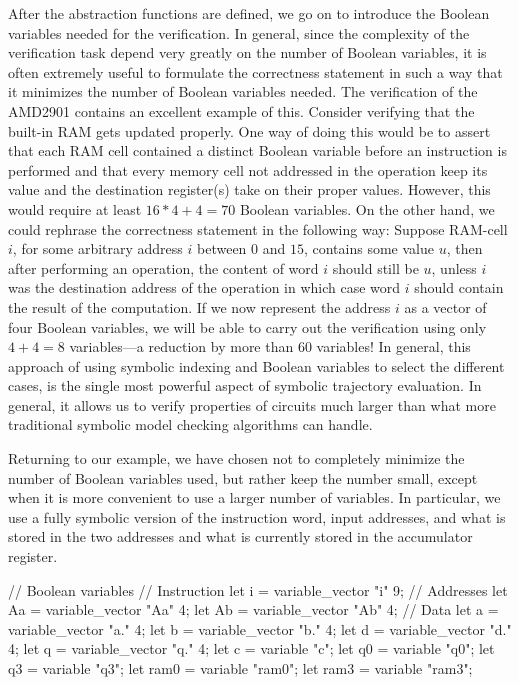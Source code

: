 After the abstraction functions are defined, we go on to introduce the
Boolean variables%
%
{} needed for the verification.
In general, since the complexity of the verification%
%
{} task
depend very greatly on the number of Boolean variables, it is
often extremely useful to formulate the correctness statement in such
a way that it minimizes the number of Boolean variables needed.
The verification of the AMD2901 contains an excellent example
of this.
Consider verifying that the built-in RAM gets updated properly.
One way of doing this would be to assert that each RAM cell contained a
distinct Boolean variable before an instruction is performed and that
every memory cell not addressed in the operation keep its value and the
destination register(s) take on their proper values.
However, this would require at least $16*4+4=70$ Boolean variables.
On the other hand, we could rephrase the correctness statement in the
following way:
Suppose RAM-cell $i$, for some arbitrary address $i$ between $0$ and $15$,
contains some value $u$, then after performing an operation, the content
of word $i$ should still be $u$, unless $i$ was the destination address of the
operation in which case word $i$ should contain the result of the computation.
If we now represent the address $i$ as a vector of four Boolean variables,
we will be able to carry out the verification using only $4+4=8$ variables---a
reduction by more than 60 variables!
In general, this approach of using symbolic indexing and Boolean variables
to select the different cases, is the single most powerful aspect of symbolic
trajectory evaluation.
In general, it allows us to verify properties of circuits much larger
than what more traditional symbolic model checking algorithms can handle.

Returning to our example, we have chosen not to completely minimize
the number of Boolean variables used, but rather keep the number small,
except when it is more convenient to use a larger number of variables.
In particular, we use a fully symbolic version of the instruction word, 
input addresses, and what is stored in the two addresses and what is
currently stored in the accumulator register.
\begin{hol}
// Boolean variables
// Instruction
let i = variable\_vector "i" 9;
// Addresses
let Aa = variable\_vector "Aa" 4;
let Ab = variable\_vector "Ab" 4;
// Data
let a = variable\_vector "a." 4;
let b = variable\_vector "b." 4;
let d = variable\_vector "d." 4;
let q = variable\_vector "q." 4;
let c = variable "c";
let q0 = variable "q0";
let q3 = variable "q3";
let ram0 = variable "ram0";
let ram3 = variable "ram3";
\end{hol}

